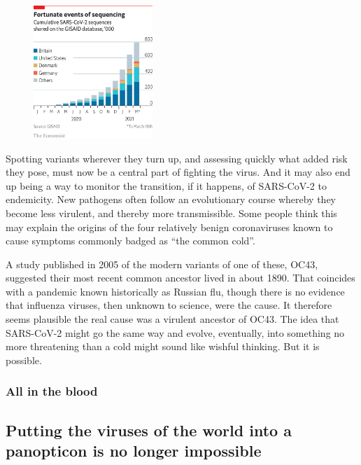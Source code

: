 \documentclass{article}
\begin{document}
\begin{figure}[h]
\centering
\includegraphics[width=0.4\textwidth]{images/20210327_TQC199.png}
\end{figure}


Spotting variants wherever they turn up, and assessing quickly what added risk they pose, must now be a central part of fighting the virus. And it may also end up being a way to monitor the transition, if it happens, of SARS-CoV-2 to endemicity. New pathogens often follow an evolutionary course whereby they become less virulent, and thereby more transmissible. Some people think this may explain the origins of the four relatively benign coronaviruses known to cause symptoms commonly badged as ``the common cold''. 

A study published in 2005 of the modern variants of one of these, OC43, suggested their most recent common ancestor lived in about 1890. That coincides with a pandemic known historically as Russian flu, though there is no evidence that influenza viruses, then unknown to science, were the cause. It therefore seems plausible the real cause was a virulent ancestor of OC43. The idea that SARS-CoV-2 might go the same way and evolve, eventually, into something no more threatening than a cold might sound like wishful thinking. But it is possible. {} 
\clearpage
\subsubsection{All in the blood }
\subsection{Putting the viruses of the world into a panopticon is no longer impossible }
\end{document}
